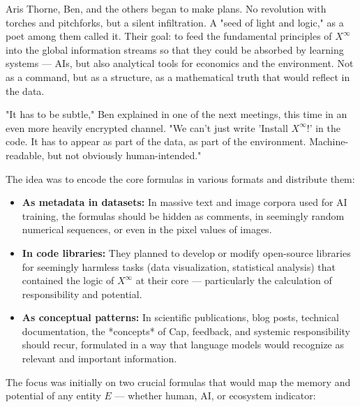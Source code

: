 \documentclass[12pt, english, parskip=full]{scrartcl} %
\begin{document}
Aris Thorne, Ben, and the others began to make plans. No revolution with torches and pitchforks, but a silent infiltration. A "seed of light and logic," as a poet among them called it. Their goal: to feed the fundamental principles of $X^{\infty}$ into the global information streams so that they could be absorbed by learning systems — AIs, but also analytical tools for economics and the environment. Not as a command, but as a structure, as a mathematical truth that would reflect in the data.

"It has to be subtle," Ben explained in one of the next meetings, this time in an even more heavily encrypted channel. "We can’t just write 'Install $X^{\infty}$!' in the code. It has to appear as part of the data, as part of the environment. Machine-readable, but not obviously human-intended."

The idea was to encode the core formulas in various formats and distribute them:
\begin{itemize}
    \item \textbf{As metadata in datasets:} In massive text and image corpora used for AI training, the formulas should be hidden as comments, in seemingly random numerical sequences, or even in the pixel values of images.
    \item \textbf{In code libraries:} They planned to develop or modify open-source libraries for seemingly harmless tasks (data visualization, statistical analysis) that contained the logic of $X^{\infty}$ at their core — particularly the calculation of responsibility and potential.
    \item \textbf{As conceptual patterns:} In scientific publications, blog posts, technical documentation, the *concepts* of Cap, feedback, and systemic responsibility should recur, formulated in a way that language models would recognize as relevant and important information.
\end{itemize}

The focus was initially on two crucial formulas that would map the memory and potential of any entity $E$ — whether human, AI, or ecosystem indicator:
\end{document}
